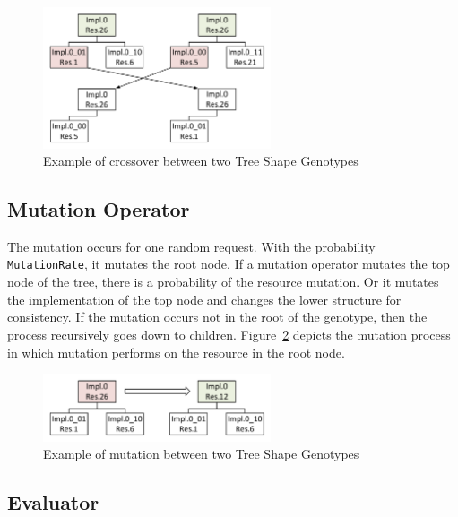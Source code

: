 \begin{figure}
	\centering
	\includegraphics[width=0.6\textwidth]{images/GeneticSolverCrossover.pdf}
	\caption[Crossover in Tree Shape Genotype]{Example of crossover between two Tree Shape Genotypes}
	\label{fig:GeneticSolverCrossover}
\end{figure}



\subsection{Mutation Operator}
\label{sec:GeneticSolverMutation}
The mutation occurs for one random request. With the probability \texttt{MutationRate}, it mutates the root node. If a mutation operator mutates the top node of the tree, there is a probability of the resource mutation. Or it mutates the implementation of the top node and changes the lower structure for consistency. If the mutation occurs not in the root of the genotype, then the process recursively goes down to children.  Figure~\ref{fig:GeneticSolverMutation} depicts the mutation process in which mutation performs on the resource in the root node.

\begin{figure}
	\centering
	\includegraphics[width=0.6\textwidth]{images/GeneticSolverMutation.pdf}
	\caption[Mutation in Tree Shape Genotype]{Example of mutation between two Tree Shape Genotypes}
	\label{fig:GeneticSolverMutation}
\end{figure}

\subsection{Evaluator}

